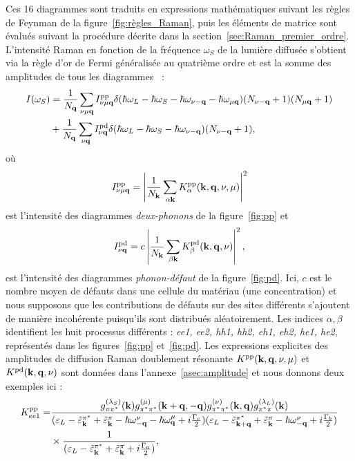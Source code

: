 Ces 16 diagrammes sont traduits en expressions mathématiques suivant les règles de Feynman de la figure~\ref{fig:règles_Raman}, puis les éléments de matrice sont évalués suivant la procédure décrite dans la section~\ref{sec:Raman_premier_ordre}. L'intensité Raman en fonction de la fréquence $\omega_S$ de la lumière diffusée s'obtient via la règle d'or de Fermi généralisée au quatrième ordre et est la somme des amplitudes de tous les diagrammes~\cite{venezuelaTheoryDoubleresonantRaman2011,graziottoTheoryInfraredDoubleresonance2024} :
\begin{equation}
    \begin{split}
    I(\omega_S) &= \frac{1}{N_{\mathbf{q}}}\sum_{\nu\mu\mathbf{q}}I^{\text{pp}}_{\nu\mu\mathbf{q}}\delta(\hbar\omega_L-\hbar\omega_S-\hbar\omega_{\nu-\mathbf{q}}-\hbar\omega_{\mu\mathbf{q}})(N_{\nu-\mathbf{q}}+1)(N_{\mu\mathbf{q}}+1)\\
    &+ \frac{1}{N_{\mathbf{q}}}\sum_{\nu\mathbf{q}}I^{\text{pd}}_{\nu\mathbf{q}}\delta(\hbar\omega_L-\hbar\omega_S-\hbar\omega_{\nu-\mathbf{q}})(N_{\nu-\mathbf{q}}+1),
    \end{split}\label{eqn:Raman_2nd}
\end{equation}
où
\begin{equation}
    I^{\text{pp}}_{\nu\mu\mathbf{q}} = \left|\frac{1}{N_{\mathbf{k}}}\sum_{\alpha\mathbf{k}}K^{\text{pp}}_\alpha(\mathbf{k},\mathbf{q},\nu,\mu)\right|^2\label{eqn:I_pp}
\end{equation}
est l'intensité des diagrammes \textit{deux-phonons} de la figure~\ref{fig:pp} et
\begin{equation}
    I^{\text{pd}}_{\nu\mathbf{q}} = c\left|\frac{1}{N_{\mathbf{k}}}\sum_{\beta\mathbf{k}}K^{\text{pd}}_\beta (\mathbf{k},\mathbf{q},\nu)\right|^2,\label{eqn:I_pd}
\end{equation}
est l'intensité des diagrammes \textit{phonon-défaut} de la figure~\ref{fig:pd}. Ici, $c$ est le nombre moyen de défauts dans une cellule du matériau (une concentration) et nous supposons que les contributions de défauts sur des sites différents s'ajoutent de manière incohérente puisqu'ils sont distribués aléatoirement. Les indices $\alpha,\beta$ identifient les huit processus différents : \textit{ee1, ee2, hh1, hh2, eh1, eh2, he1, he2}, représentés dans les figures~\ref{fig:pp} et~\ref{fig:pd}. Les expressions explicites des amplitudes de diffusion Raman doublement résonante $K^{\text{pp}}(\mathbf{k},\mathbf{q},\nu,\mu)$ et $K^{\text{pd}}(\mathbf{k},\mathbf{q},\nu)$ sont données dans l'annexe~\ref{asec:amplitude} et nous donnons deux exemples ici :
\begin{equation}
    \begin{split}
    K_{ee1}^{\text{pp}} = &\frac{g^{(\lambda_S)}_{\pi\pi^*}(\mathbf{k})g^{(\mu)}_{\pi^*\pi^*}(\mathbf{k}+\mathbf{q},-\mathbf{q})g_{\pi^*\pi^*}^{(\nu)}(\mathbf{k},\mathbf{q})g_{\pi^*\pi}^{(\lambda_L)}(\mathbf{k})}{(\varepsilon_L-\tilde{\varepsilon}_{\mathbf{k}}^{\pi^*}+\tilde{\varepsilon}_{\mathbf{k}}^\pi-\hbar\omega_{-\mathbf{q}}^\nu-\hbar\omega_{\mathbf{q}}^\mu+i\frac{\Gamma_c}{2})(\varepsilon_L-\tilde{\varepsilon}_{\mathbf{k}+\mathbf{q}}^{\pi^*}+\tilde{\varepsilon}_{\mathbf{k}}^\pi-\hbar\omega_{-\mathbf{q}}^\nu+i\frac{\Gamma_b}{2})}\\
    &\times\frac{1}{(\varepsilon_L-\tilde{\varepsilon}_{\mathbf{k}}^{\pi^*}+\tilde{\varepsilon}_{\mathbf{k}}^\pi+i\frac{\Gamma_a}{2})},\label{eqn:K_ee1_pp}
    \end{split}
\end{equation}
